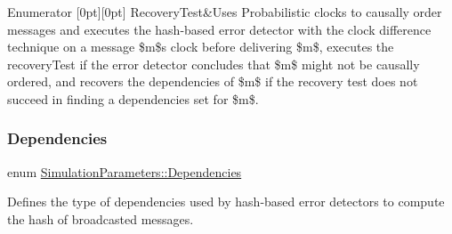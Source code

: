 \begin{DoxyEnumFields}{Enumerator}
[0pt][0pt]{}\mbox{\label{class_simulation_parameters_ae08444273809241f502aa422205f7307a54bac2e6b76064db3dcf3d7c3a7b787b}} 
Recovery\+Test&Uses Probabilistic clocks to causally order messages and executes the hash-\/based error detector with the clock difference technique on a message \$m\$\textquotesingle{}s clock before delivering \$m\$, executes the recovery\+Test if the error detector concludes that \$m\$ might not be causally ordered, and recovers the dependencies of \$m\$ if the recovery test does not succeed in finding a dependencies set for \$m\$. \\
\hline

\end{DoxyEnumFields}
\mbox{\label{class_simulation_parameters_afb3b6aaecd4b19ef1991c870c8402dff}} 
\subsubsection{\texorpdfstring{Dependencies}{Dependencies}}
{\footnotesize\ttfamily enum \hyperlink{class_simulation_parameters_afb3b6aaecd4b19ef1991c870c8402dff}{Simulation\+Parameters\+::\+Dependencies}\hspace{0.3cm}{\ttfamily [strong]}}



Defines the type of dependencies used by hash-\/based error detectors to compute the hash of broadcasted messages. 

